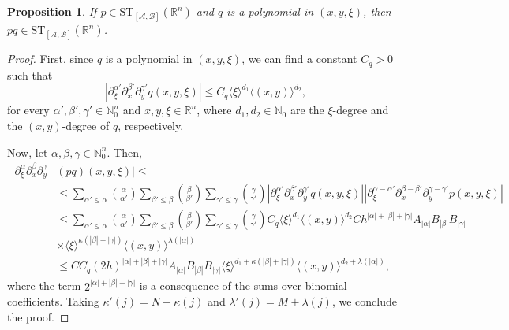 \documentclass[11pt,reqno]{amsart}
\numberwithin{equation}{section}
\newtheorem{proposition}[theorem]{Proposition}
\newcommand{\ST}{{\mathrm{ST}}}
\newcommand{\A}{{\mathcal{A}}} %
\newcommand{\B}{{\mathcal{B}}} %
\begin{document}
\begin{proposition}\label{poly_ST}
	If $p\in \ST_{[\A,\B]}(\mathbb{R}^n)$ and $q$ is a polynomial in $(x,y,\xi)$, then $pq\in \ST_{[\A,\B]}(\mathbb{R}^n)$.
\end{proposition}
%
\begin{proof}
	First, since $q$ is a polynomial in $(x,y,\xi)$, we can find a constant $C_q>0$ such that
	\[|\partial_\xi^{\alpha'}\partial_x^{\beta'}\partial_y^{\gamma'} q(x,y,\xi)|\leq C_q\langle\xi\rangle^{d_1}\langle(x,y)\rangle^{d_2},\]
	for every $\alpha',\beta',\gamma'\in\mathbb{N}_0^n$ and $x,y,\xi\in\mathbb{R}^n$, where $d_1,d_2\in\mathbb{N}_0$ are the $\xi$-degree and the $(x,y)$-degree of $q$, respectively.
	
	Now, let $\alpha,\beta,\gamma\in\mathbb{N}_0^n$. Then,
	\begin{align*}
		|\partial_\xi^{\alpha} \partial_x^{\beta} \partial_y^{\gamma} &(pq)(x,y,\xi)| \leq
		\\ &\leq \sum_{\alpha'\leq\alpha}\binom{\alpha}{\alpha'} \sum_{\beta'\leq\beta}\binom{\beta}{\beta'} \sum_{\gamma'\leq\gamma}\binom{\gamma}{\gamma'} |\partial_\xi^{\alpha'}\partial_x^{\beta'}\partial_y^{\gamma'} q(x,y,\xi)||\partial_\xi^{\alpha-\alpha'}\partial_x^{\beta-\beta'}\partial_y^{\gamma-\gamma'} p(x,y,\xi)|\\
		& \leq \sum_{\alpha'\leq\alpha}\binom{\alpha}{\alpha'} \sum_{\beta'\leq\beta}\binom{\beta}{\beta'} \sum_{\gamma'\leq\gamma}\binom{\gamma}{\gamma'} C_q\langle\xi\rangle^{d_1}\langle(x,y)\rangle^{d_2} Ch^{|\alpha|+|\beta|+|\gamma|} A_{|\alpha|}B_{|\beta|}B_{|\gamma|} \\
		& \times \langle \xi\rangle^{\kappa(|\beta|+|\gamma|)}\langle(x,y)\rangle^{\lambda(|\alpha|)}\\
		& \leq CC_q(2h)^{|\alpha|+|\beta|+|\gamma|} A_{|\alpha|}B_{|\beta|}B_{|\gamma|} \langle \xi\rangle^{d_1+\kappa(|\beta|+|\gamma|)}\langle(x,y)\rangle^{d_2+\lambda(|\alpha|)},
	\end{align*}
	where the term $2^{|\alpha|+|\beta|+|\gamma|}$ is a consequence of the sums over binomial coefficients. Taking $\kappa'(j)=N+\kappa(j)$ and $\lambda'(j)=M+\lambda(j)$, we conclude the proof.    
\end{proof}
\end{document}
